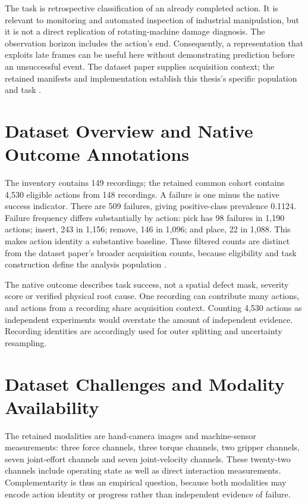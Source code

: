 The task is retrospective classification of an already completed action. It is relevant
to monitoring and automated inspection of industrial manipulation, but it is not a
direct replication of rotating-machine damage diagnosis. The observation horizon
includes the action's end. Consequently, a representation that exploits late frames can
be useful here without demonstrating prediction before an unsuccessful event. The
dataset paper supplies acquisition context; the retained manifests and implementation
establish this thesis's specific population and task
\parencite{Sliwowski2025REASSEMBLE}.

\section{Dataset Overview and Native Outcome Annotations}
The inventory contains 149 recordings; the retained common cohort contains 4,530
eligible actions from 148 recordings. A failure is one minus the native success
indicator. There are 509 failures, giving positive-class prevalence 0.1124. Failure
frequency differs substantially by action: pick has 98 failures in 1,190 actions;
insert, 243 in 1,156; remove, 146 in 1,096; and place, 22 in 1,088. This makes action
identity a substantive baseline. These filtered counts are distinct from the dataset
paper's broader acquisition counts, because eligibility and task construction define the
analysis population \citep{Sliwowski2025REASSEMBLE}.

The native outcome describes task success, not a spatial defect mask, severity score or
verified physical root cause. One recording can contribute many actions, and actions
from a recording share acquisition context. Counting 4,530 actions as independent
experiments would overstate the amount of independent evidence. Recording identities are
accordingly used for outer splitting and uncertainty resampling.

\section{Dataset Challenges and Modality Availability}
The retained modalities are hand-camera images and machine-sensor measurements: three
force channels, three torque channels, two gripper channels, seven joint-effort channels
and seven joint-velocity channels. These twenty-two channels include operating state as
well as direct interaction measurements. Complementarity is thus an empirical question,
because both modalities may encode action identity or progress rather than independent
evidence of failure.

